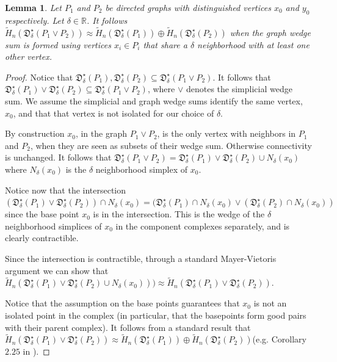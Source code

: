 \documentclass[pdflatex,bst/sn-mathphys-num]{sn-jnl}%
\newcommand{\toti}[1] {{\textcolor{pink}{{\sf Tobias: } #1}}}
\theoremstyle{thmstyleone}%
\newtheorem{lem}[theorem]{Lemma}%
\theoremstyle{definition}
\theoremstyle{thmstyletwo}%
\newcommand{\FD}{\mathfrak{D}}
\theoremstyle{thmstylethree}%
\begin{document}
\begin{lem}\label{lem:graph_sum}
    Let $P_1$ and $P_2$ be directed graphs with distinguished vertices $x_0$ and $y_0$ respectively. Let $\delta\in\mathbb{R}$. It follows $\tilde{H}_n(\FD^\star_\delta(P_1\vee P_2))
    \approx
    \tilde{H}_n(\FD^\star_\delta(P_1))\oplus \tilde{H}_n(\FD^\star_\delta(P_2))
    $  when the graph wedge sum is formed using vertices $x_i\in P_i$ that share a $\delta$ neighborhood with at least one other vertex.
\end{lem}
\begin{proof}
    Notice that $\FD^\star_\delta(P_1),\FD^\star_\delta(P_2)\subseteq \FD^\star_\delta(P_1\vee P_2)$. It follows that $\FD^\star_\delta(P_1)\vee \FD^\star_\delta(P_2)\subseteq  \FD^\star_\delta(P_1\vee P_2)$, where $\vee$ denotes the simplicial wedge sum. We assume the simplicial and graph wedge sums identify the same vertex, $x_0$, and that that vertex is not isolated for our choice of $\delta$.

    By construction $x_0$, in the graph $P_1\vee P_2$, is the only vertex with neighbors in $P_1$ and $P_2$, when they are seen as subsets of their wedge sum. Otherwise connectivity is unchanged. It follows that $\FD^\star_\delta(P_1\vee P_2)
    =
    \FD^\star_\delta(P_1)\vee \FD^\star_\delta(P_2) \cup N_\delta(x_0)$ where $N_\delta(x_0)$ is the $\delta$ neighborhood simplex of $x_0$.

    Notice now that the intersection $(\FD^\star_\delta(P_1)\vee \FD^\star_\delta(P_2)) \cap N_\delta(x_0)=(\FD^\star_\delta(P_1)\cap N_\delta(x_0)\vee (\FD^\star_\delta(P_2)\cap N_\delta(x_0)
    )$ since the base point $x_0$ is in the intersection. This is the wedge of the $\delta$ neighborhood simplices of $x_0$ in the component complexes separately, and is clearly contractible. 

    Since the intersection is contractible, through a standard Mayer-Vietoris argument we can show that 
    $\tilde{H}_n(\FD^\star_\delta(P_1)\vee \FD^\star_\delta(P_2) \cup N_\delta(x_0)))
    \approx
    \tilde{H}_n(\FD^\star_\delta(P_1)\vee \FD^\star_\delta(P_2))$.

    Notice that the assumption on the base points guarantees that $x_0$ is not an isolated point in the complex (in particular, that the basepoints form good pairs with their parent complex). It follows from a standard result that $\tilde{H}_n(\FD^\star_\delta(P_1)\vee \FD^\star_\delta(P_2))\approx \tilde{H}_n(\FD^\star_\delta(P_1))\oplus \tilde{H}_n(\FD^\star_\delta(P_2))$(e.g. Corollary $2.25$ in \cite{Hatcher_AT}).
\end{proof}
\end{document}
